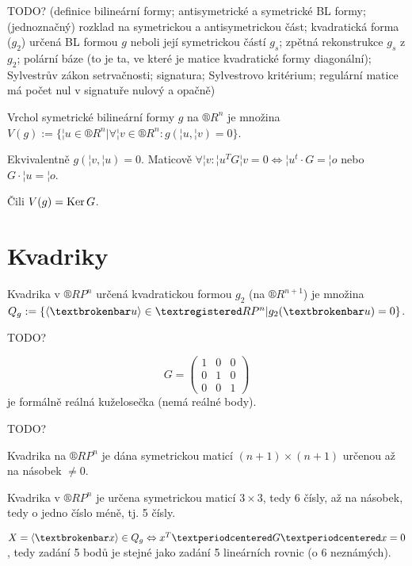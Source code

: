 \documentclass[12pt]{article}					%
\begin{document}

TODO? (definice bilineární formy; antisymetrické a symetrické BL formy; (jednoznačný) rozklad na symetrickou a antisymetrickou část; kvadratická forma ($g_2$) určená BL formou $g$ neboli její symetrickou částí $g_s$; zpětná rekonstrukce $g_s$ z $g_2$; polární báze (to je ta, ve které je matice kvadratické formy diagonální); Sylvestrův zákon setrvačnosti; signatura; Sylvestrovo kritérium; regulární matice má počet nul v signatuře nulový a opačně)

\begin{definice}
	Vrchol symetrické bilineární formy $g$ na $®R^n$ je množina $V(g) := \{¦u \in ®R^n | \forall ¦v \in ®R^n : g(¦u, ¦v) = 0\}$.

	\begin{poznamkain}
		Ekvivalentně $g(¦v, ¦u) = 0$. Maticově $\forall ¦v: ¦u^T G ¦v = 0 \Leftrightarrow ¦u^t·G = ¦o$ nebo $G·¦u = ¦o$.

		Čili $V(g) = \operatorname{Ker} G$.
	\end{poznamkain}
\end{definice}

\section{Kvadriky}
\begin{definice}[Kvadrika]
	Kvadrika v $®RP^n$ určená kvadratickou formou $g_2$ (na $®R^{n+1}$) je množina $Q_g := \{\<¦u\> \in ®RP^n | g_2(¦u) = 0\}$.
\end{definice}

\begin{priklady}
	TODO?

	$$ G = \begin{pmatrix} 1 & 0 & 0 \\ 0 & 1 & 0 \\ 0 & 0 & 1 \end{pmatrix} $$
	je formálně reálná kuželosečka (nemá reálné body).

	TODO?
\end{priklady}

\begin{dusledek}
	Kvadrika na $®RP^n$ je dána symetrickou maticí $(n+1) \times (n+1)$ určenou až na násobek $≠0$.
\end{dusledek}

\begin{dusledek}
	Kvadrika v $®RP^n$ je určena symetrickou maticí $3\times 3$, tedy 6 čísly, až na násobek, tedy o jedno číslo méně, tj. 5 čísly.

	\begin{dusledekin}
		$X = \<¦x\> \in Q_g \Leftrightarrow x^T·G·x = 0$, tedy zadání 5 bodů je stejné jako zadání 5 lineárních rovnic (o 6 neznámých).
	\end{dusledekin}
\end{dusledek}
\end{document}
